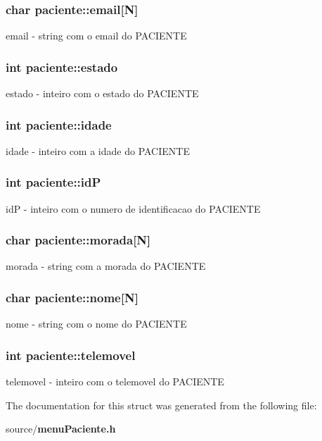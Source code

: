 \subsubsection[{email}]{\setlength{\rightskip}{0pt plus 5cm}char paciente\+::email[N]}\label{structpaciente_a005a995e8291b4942f054bb0fc445ec0}
email -\/ string com o email do P\+A\+C\+I\+E\+N\+T\+E 
\subsubsection[{estado}]{\setlength{\rightskip}{0pt plus 5cm}int paciente\+::estado}\label{structpaciente_a3bab7b45a2d8d2f308b7b4ebc4cdab62}
estado -\/ inteiro com o estado do P\+A\+C\+I\+E\+N\+T\+E 
\subsubsection[{idade}]{\setlength{\rightskip}{0pt plus 5cm}int paciente\+::idade}\label{structpaciente_a80d872821e288330c50ec057b86f9a27}
idade -\/ inteiro com a idade do P\+A\+C\+I\+E\+N\+T\+E 
\subsubsection[{id\+P}]{\setlength{\rightskip}{0pt plus 5cm}int paciente\+::id\+P}\label{structpaciente_a50f478ba34af4b919095b88e9a470b4b}
id\+P -\/ inteiro com o numero de identificacao do P\+A\+C\+I\+E\+N\+T\+E 
\subsubsection[{morada}]{\setlength{\rightskip}{0pt plus 5cm}char paciente\+::morada[N]}\label{structpaciente_a01b10fe5cb5f592c23285ff2871eecb6}
morada -\/ string com a morada do P\+A\+C\+I\+E\+N\+T\+E 
\subsubsection[{nome}]{\setlength{\rightskip}{0pt plus 5cm}char paciente\+::nome[N]}\label{structpaciente_a76a176109afb15ae394e1e310efb9aa6}
nome -\/ string com o nome do P\+A\+C\+I\+E\+N\+T\+E 
\subsubsection[{telemovel}]{\setlength{\rightskip}{0pt plus 5cm}int paciente\+::telemovel}\label{structpaciente_ab8166d08425b96cf84fe614d9fab3e4a}
telemovel -\/ inteiro com o telemovel do P\+A\+C\+I\+E\+N\+T\+E 

The documentation for this struct was generated from the following file\+:\begin{DoxyCompactItemize}
\item 
source/{\bf menu\+Paciente.\+h}\end{DoxyCompactItemize}
